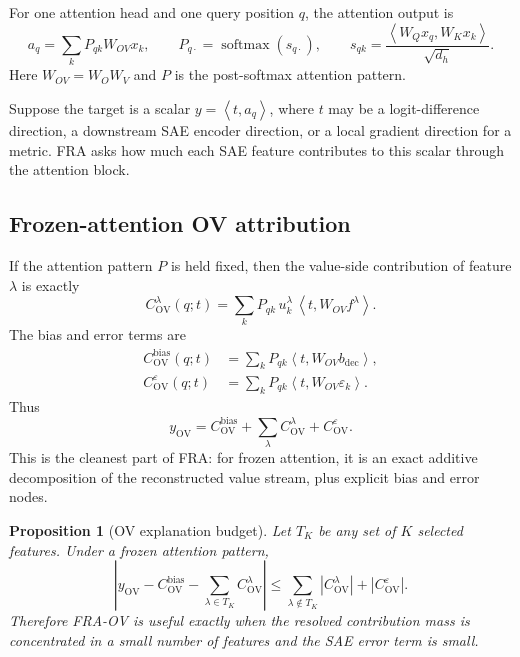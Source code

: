 \documentclass[11pt]{article}
\newcommand{\ip}[2]{\left\langle #1,#2\right\rangle}
\newcommand{\softmax}{\operatorname{softmax}}
\newcommand{\OV}{\mathrm{OV}}
\newcommand{\bdec}{b_{\mathrm{dec}}}
\theoremstyle{definition}
\theoremstyle{plain}
\newtheorem{proposition}{Proposition}
\theoremstyle{remark}
\begin{document}
For one attention head and one query position $q$, the attention output is
\begin{equation}
    a_q = \sum_k P_{qk} W_{OV} x_k,
    \qquad
    P_{q\cdot}=\softmax(s_{q\cdot}),
    \qquad
    s_{qk}=\frac{\ip{W_Q x_q}{W_K x_k}}{\sqrt{d_h}}.
\end{equation}
Here $W_{OV}=W_O W_V$ and $P$ is the post-softmax attention pattern.

Suppose the target is a scalar $y=\ip{t}{a_q}$, where $t$ may be a logit-difference
direction, a downstream SAE encoder direction, or a local gradient direction for
a metric.  FRA asks how much each SAE feature contributes to this scalar through
the attention block.

\subsection{Frozen-attention OV attribution}

If the attention pattern $P$ is held fixed, then the value-side contribution of
feature $\lambda$ is exactly
\begin{equation}
    C^\lambda_{\OV}(q;t)
    =
    \sum_k P_{qk}\,
    u_k^\lambda\,
    \ip{t}{W_{OV} f^\lambda}.
    \label{eq:ov_contribution}
\end{equation}
The bias and error terms are
\begin{align}
    C^{\mathrm{bias}}_{\OV}(q;t)
    &= \sum_k P_{qk}\ip{t}{W_{OV}\bdec}, \\
    C^{\varepsilon}_{\OV}(q;t)
    &= \sum_k P_{qk}\ip{t}{W_{OV}\varepsilon_k}.
\end{align}
Thus
\begin{equation}
    y_{\OV}
    =
    C^{\mathrm{bias}}_{\OV}
    + \sum_\lambda C^\lambda_{\OV}
    + C^{\varepsilon}_{\OV}.
    \label{eq:ov_exact}
\end{equation}
This is the cleanest part of FRA: for frozen attention, it is an exact additive
decomposition of the reconstructed value stream, plus explicit bias and error
nodes.

\begin{proposition}[OV explanation budget]
Let $T_K$ be any set of $K$ selected features.  Under a frozen attention pattern,
\begin{equation}
\left|
    y_{\OV}
    - C^{\mathrm{bias}}_{\OV}
    - \sum_{\lambda\in T_K} C^\lambda_{\OV}
\right|
\le
    \sum_{\lambda\notin T_K}\left|C^\lambda_{\OV}\right|
    + \left|C^\varepsilon_{\OV}\right|.
\end{equation}
Therefore FRA-OV is useful exactly when the resolved contribution mass is
concentrated in a small number of features and the SAE error term is small.
\end{proposition}
\end{document}
